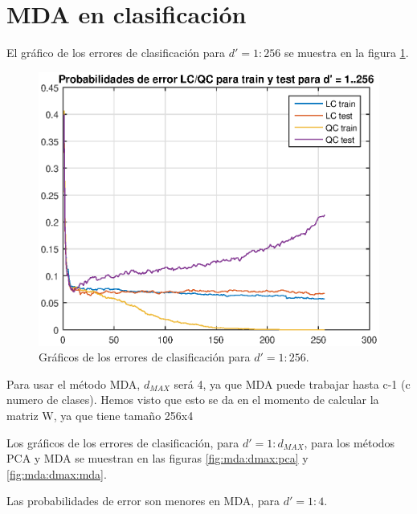 \documentclass[11pt]{article} %
\begin{document}
\clearpage

\section{MDA en clasificación}

El gráfico de los errores de clasificación para $d'=1:256$ se muestra en la figura \ref{fig:mda:256}.


\begin{figure}[h]
	\centering
	\includegraphics[width=\textwidth]{../22_mda/prob_error_pca.eps}
	\caption[]{\small Gráficos de los errores de clasificación para $d'=1:256$.}
	\label{fig:mda:256}
\end{figure}

Para usar el método MDA, $d_{MAX}$ será 4, ya que MDA puede trabajar hasta c-1 (c numero de clases). Hemos visto que esto se da en el momento de calcular la matriz W, ya que tiene tamaño 256x4

Los gráficos de los errores de clasificación, para $d'=1:d_{MAX}$, para los métodos PCA y MDA se muestran en las figuras \ref{fig:mda:dmax:pca} y \ref{fig:mda:dmax:mda}.

Las probabilidades de error son menores en MDA, para $d'=1:4$.

\clearpage
\end{document}
